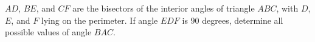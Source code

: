 $AD$,  $BE$,  and $CF$ are the bisectors of the interior angles of triangle $ABC$,  with $D$,  $E$,  and $F$ lying on the perimeter.  If angle $EDF$ is $90$ degrees, determine all possible values of angle $BAC$.